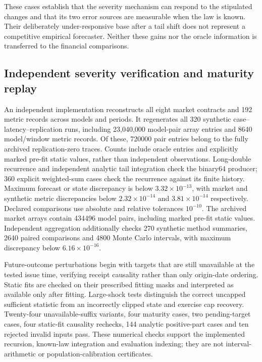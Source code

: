 \documentclass[11pt,a4paper]{article}
\theoremstyle{definition}\newtheorem{definition}[theorem]{Definition}
\begin{document}
These cases establish that the severity mechanism can respond to the stipulated changes and that its two error sources are measurable when the law is known. Their deliberately under-responsive base after a tail shift does not represent a competitive empirical forecaster. Neither these gains nor the oracle information is transferred to the financial comparisons.

\subsection{Independent severity verification and maturity replay}
An independent implementation reconstructs all eight market contracts and 192 metric records across models and periods. It regenerates all 320 synthetic case--latency--replication runs, including 23,040,000 model-pair array entries and 8640 model/window metric records. Of these, 720000 pair entries belong to the fully archived replication-zero traces. Counts include oracle entries and explicitly marked pre-fit static values, rather than independent observations. Long-double recurrence and independent analytic tail integration check the binary64 producer; 360 explicit weighted-sum cases check the recurrence against its finite history. Maximum forecast or state discrepancy is below $3.32\times10^{-13}$, with market and synthetic metric discrepancies below $2.32\times10^{-14}$ and $3.81\times10^{-14}$ respectively. Declared comparisons use absolute and relative tolerances $10^{-10}$. The archived market arrays contain 434496 model pairs, including marked pre-fit static values. Independent aggregation additionally checks 270 synthetic method summaries, 2640 paired comparisons and 4800 Monte Carlo intervals, with maximum discrepancy below $6.16\times10^{-16}$.

Future-outcome perturbations begin with targets that are still unavailable at the tested issue time, verifying receipt causality rather than only origin-date ordering. Static fits are checked on their prescribed fitting masks and interpreted as available only after fitting. Large-shock tests distinguish the correct uncapped sufficient statistic from an incorrectly clipped state and exercise cap recovery. Twenty-four unavailable-suffix variants, four maturity cases, two pending-target cases, four static-fit causality rechecks, 144 analytic positive-part cases and ten rejected invalid inputs pass. These numerical checks support the implemented recursion, known-law integration and evaluation indexing; they are not interval-arithmetic or population-calibration certificates.
\end{document}
